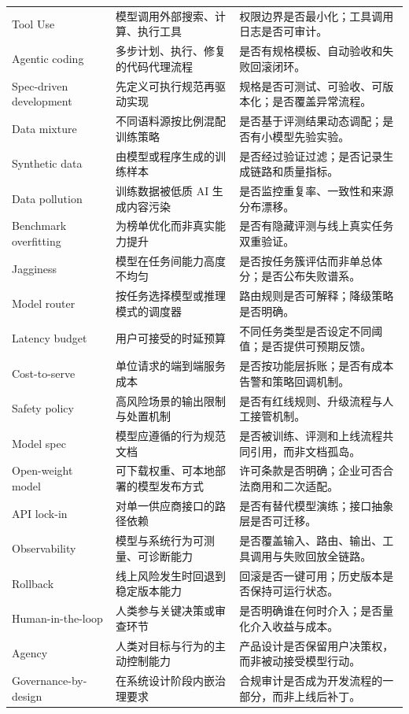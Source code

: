 \documentclass[a4paper]{article}
\begin{document}
\begin{longtable}{p{}p{}p{}}
Tool Use & 模型调用外部搜索、计算、执行工具 & 权限边界是否最小化；工具调用日志是否可审计。 \\
Agentic coding & 多步计划、执行、修复的代码代理流程 & 是否有规格模板、自动验收和失败回滚闭环。 \\
Spec-driven development & 先定义可执行规范再驱动实现 & 规格是否可测试、可验收、可版本化；是否覆盖异常流程。 \\
Data mixture & 不同语料源按比例混配训练策略 & 是否基于评测结果动态调配；是否有小模型先验实验。 \\
Synthetic data & 由模型或程序生成的训练样本 & 是否经过验证过滤；是否记录生成链路和质量指标。 \\
Data pollution & 训练数据被低质 AI 生成内容污染 & 是否监控重复率、一致性和来源分布漂移。 \\
Benchmark overfitting & 为榜单优化而非真实能力提升 & 是否有隐藏评测与线上真实任务双重验证。 \\
Jagginess & 模型在任务间能力高度不均匀 & 是否按任务簇评估而非单总体分；是否公布失败谱系。 \\
Model router & 按任务选择模型或推理模式的调度器 & 路由规则是否可解释；降级策略是否明确。 \\
Latency budget & 用户可接受的时延预算 & 不同任务类型是否设定不同阈值；是否提供可预期反馈。 \\
Cost-to-serve & 单位请求的端到端服务成本 & 是否按功能层拆账；是否有成本告警和策略回调机制。 \\
Safety policy & 高风险场景的输出限制与处置机制 & 是否有红线规则、升级流程与人工接管机制。 \\
Model spec & 模型应遵循的行为规范文档 & 是否被训练、评测和上线流程共同引用，而非文档孤岛。 \\
Open-weight model & 可下载权重、可本地部署的模型发布方式 & 许可条款是否明确；企业可否合法商用和二次适配。 \\
API lock-in & 对单一供应商接口的路径依赖 & 是否有替代模型演练；接口抽象层是否可迁移。 \\
Observability & 模型与系统行为可测量、可诊断能力 & 是否覆盖输入、路由、输出、工具调用与失败回放全链路。 \\
Rollback & 线上风险发生时回退到稳定版本能力 & 回滚是否一键可用；历史版本是否保持可运行状态。 \\
Human-in-the-loop & 人类参与关键决策或审查环节 & 是否明确谁在何时介入；是否量化介入收益与成本。 \\
Agency & 人类对目标与行为的主动控制能力 & 产品设计是否保留用户决策权，而非被动接受模型行动。 \\
Governance-by-design & 在系统设计阶段内嵌治理要求 & 合规审计是否成为开发流程的一部分，而非上线后补丁。 \\
\bottomrule
\end{longtable}
\end{document}
